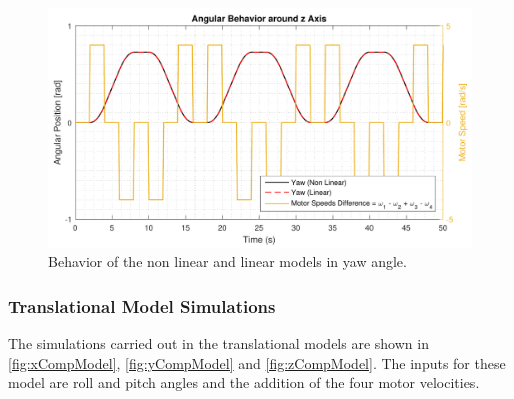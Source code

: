 %
\begin{figure}[H]
	\centering
	\includegraphics[scale=0.65]{figures/yawCompModel}
	\caption{Behavior of the non linear and linear models in yaw angle.}
	\label{fig:yawCompModel}
\end{figure}

\subsubsection{Translational Model Simulations}
The simulations carried out in the translational models are shown in  \autoref{fig:xCompModel}, \ref{fig:yCompModel} and \ref{fig:zCompModel}. The inputs for these model are roll and pitch angles and the addition of the four motor velocities. 

